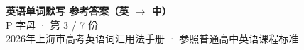 \documentclass[10pt,a4paper]{article}
\begin{document}
\pagestyle{plain}

\begin{center}
{\LARGE\bfseries 英语单词默写 \quad 参考答案（英 $\to$ 中）}\\[0.22em]
{\large P 字母 · 第 3 / 7 份}\\[0.18em]
{\small 2026年上海市高考英语词汇用法手册 · 参照普通高中英语课程标准}
\end{center}

\vspace{0.2em}
\noindent{\color{rulegray}\rule{\textwidth}{0.8pt}}

\vspace{0.35em}

\vspace{0.25em}
\renewcommand{\arraystretch}{1.32}
\end{document}

